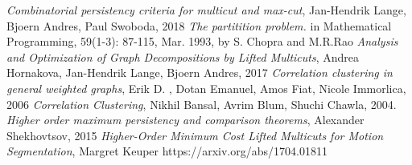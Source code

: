\documentclass[12pt]{report}
\theoremstyle{definition}
\theoremstyle{remark}
\begin{document}
\begin{thebibliography}{9}
\textit{Combinatorial persistency criteria for multicut and max-cut}, Jan-Hendrik Lange, Bjoern Andres, Paul Swoboda, 2018
 \textit{The partitition problem.} in Mathematical Programming, 59(1-3): 87-115, Mar. 1993, by S. Chopra and M.R.Rao 
 \textit{Analysis and Optimization of Graph Decompositions by Lifted Multicuts}, Andrea Hornakova, Jan-Hendrik Lange, Bjoern Andres, 2017
 \textit{Correlation clustering in general weighted graphs}, Erik D. , Dotan Emanuel, Amos Fiat, Nicole Immorlica, 2006
 \textit{Correlation Clustering}, Nikhil Bansal, Avrim Blum, Shuchi Chawla, 2004. 
 \textit{Higher order maximum persistency and comparison theorems}, Alexander Shekhovtsov, 2015
 \textit{Higher-Order Minimum Cost Lifted Multicuts for Motion Segmentation}, Margret Keuper https://arxiv.org/abs/1704.01811

\end{thebibliography}
\end{document}
